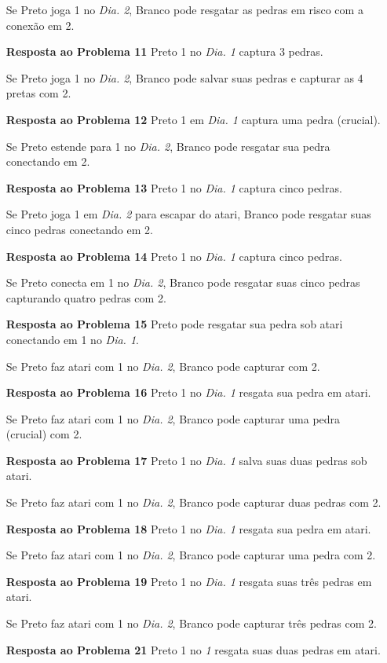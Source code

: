 \begin{itemize}
      Se Preto joga 1 no \emph{Dia. 2}, Branco pode resgatar as pedras em risco com a conexão em 2.
  \item[\textbf{Resposta ao Problema 11}]
      Preto 1 no \emph{Dia. 1} captura 3 pedras.

      Se Preto joga 1 no \emph{Dia. 2}, Branco pode salvar suas pedras e capturar as 4 pretas com 2.
  \item[\textbf{Resposta ao Problema 12}]
      Preto 1 em \emph{Dia. 1} captura uma pedra (crucial).

      Se Preto estende para 1 no \emph{Dia. 2}, Branco pode resgatar sua pedra conectando em 2.
  \item[\textbf{Resposta ao Problema 13}]
      Preto 1 no \emph{Dia. 1} captura cinco pedras.

      Se Preto joga 1 em \emph{Dia. 2} para escapar do atari, Branco pode resgatar suas cinco pedras conectando em 2.
  \item[\textbf{Resposta ao Problema 14}]
      Preto 1 no \emph{Dia. 1} captura cinco pedras.

      Se Preto conecta em 1 no \emph{Dia. 2}, Branco pode resgatar suas cinco pedras capturando quatro pedras com 2.
  \item[\textbf{Resposta ao Problema 15}]
      Preto pode resgatar sua pedra sob atari conectando em 1 no \emph{Dia. 1}.
      
      Se Preto faz atari com 1 no \emph{Dia. 2}, Branco pode capturar com 2.
  \item[\textbf{Resposta ao Problema 16}]
      Preto 1 no \emph{Dia. 1} resgata sua pedra em atari.

      Se Preto faz atari com 1 no \emph{Dia. 2}, Branco pode capturar uma pedra (crucial) com 2.
  \item[\textbf{Resposta ao Problema 17}]
      Preto 1 no \emph{Dia. 1} salva suas duas pedras sob atari.

      Se Preto faz atari com 1 no \emph{Dia. 2}, Branco pode capturar duas pedras com 2.
  \item[\textbf{Resposta ao Problema 18}]
      Preto 1 no \emph{Dia. 1} resgata sua pedra em atari.

      Se Preto faz atari com 1 no \emph{Dia. 2}, Branco pode capturar uma pedra com 2.
  \item[\textbf{Resposta ao Problema 19}]
      Preto 1 no \emph{Dia. 1} resgata suas três pedras em atari.

      Se Preto faz atari com 1 no \emph{Dia. 2}, Branco pode capturar três pedras com 2.
  \item[\textbf{Resposta ao Problema 21}]
      Preto 1 no \emph{1} resgata suas duas pedras em atari.


\end{itemize}
